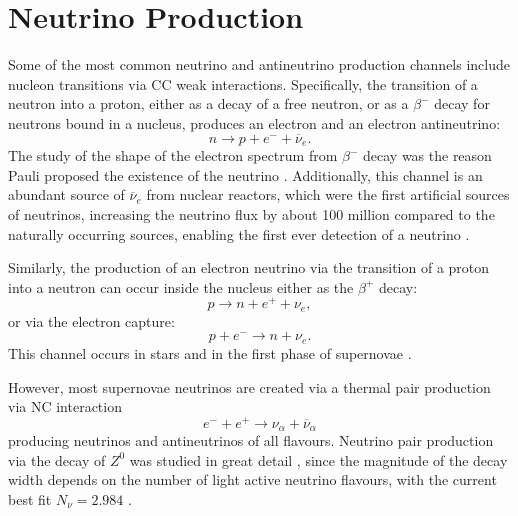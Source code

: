 \section{Neutrino Production}
Some of the most common neutrino and antineutrino production channels include nucleon transitions via \gls{CC} weak interactions. Specifically, the transition of a neutron into a proton, either as a decay of a free neutron, or as a $\beta^-$ decay for neutrons bound in a nucleus, produces an electron and an electron antineutrino:
\begin{equation}
n\rightarrow p+e^-+\overline{\nu}_e.
\end{equation}
The study of the shape of the electron spectrum from $\beta^-$ decay was the reason Pauli proposed the existence of the neutrino \cite{PauliNeutrinoProposalLetter.pdf}. Additionally, this channel is an abundant source of $\overline{\nu}_e$ from nuclear reactors, which were the first artificial sources of neutrinos, increasing the neutrino flux by about 100 million compared to the naturally occurring sources, enabling the first ever detection of a neutrino \cite{CowanReinesFirstAttempt.pdf, CowanReinesConfirmation.pdf, NeutrinoPhysicsCowanReines.pdf}.

Similarly, the production of an electron neutrino via the transition of a proton into a neutron can occur inside the nucleus either as the $\beta^+$ decay:
\begin{equation}
p\rightarrow n+e^++\nu_e,
\end{equation}
or via the electron capture:
\begin{equation}
p+e^-\rightarrow n+\nu_e.
\end{equation}
This channel occurs in stars and in the first phase of supernovae \cite{FundamentalsOfNeutrinoPhysics.pdf}.

However, most supernovae neutrinos are created via a thermal pair production via \gls{NC} interaction
\begin{equation}
e^-+e^+\rightarrow\nu_\alpha+\overline{\nu}_\alpha
\end{equation}
producing neutrinos and antineutrinos of all flavours. Neutrino pair production via the decay of $Z^0$ was studied in great detail \cite{ZDecay.pdf}, since the magnitude of the decay width depends on the number of light active neutrino flavours, with the current best fit $N_\nu=2.984$ \cite{ZDecayPrecise.pdf}.

